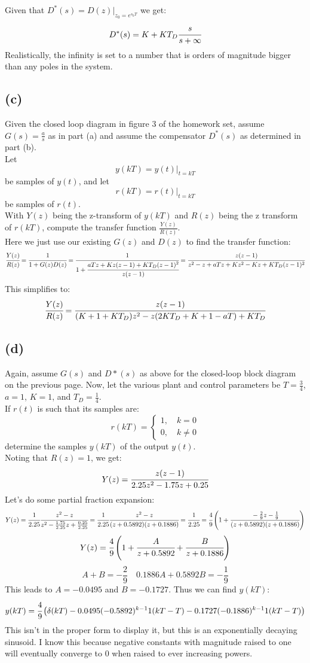 \documentclass{article}
\begin{document}
Given that $D^*(s)=D(z)\bigg|_{z_0=e^{s_0T}}$ we get:
\[D^*(s)=K+KT_D\cfrac{s}{s+\infty}\]
Realistically, the infinity is set to a number that is orders of magnitude bigger than any poles in the system.

\subsection*{(c)}
Given the closed loop diagram in figure 3 of the homework set, assume $G(s)=\frac{a}{s}$ as in part (a) and assume the compensator $D^*(s)$ as determined in part (b).\\
Let
\[y(kT)=y(t)\bigg|_{t=kT}\]
be samples of $y(t)$, and let
\[r(kT)=r(t)\bigg|_{t=kT}\]
be samples of $r(t)$.\\
With $Y(z)$ being the z-transform of $y(kT)$ and $R(z)$ being the z transform of $r(kT)$, compute the transfer function $\frac{Y(z)}{R(z)}$.\\

Here we just use our existing $G(z)$ and $D(z)$ to find the transfer function:
\[\cfrac{Y(z)}{R(z)}=\cfrac{1}{1+G(z)D(z)}=\cfrac{1}{1+\cfrac{aTz+Kz(z-1)+KT_D(z-1)^2}{z(z-1)}}=\cfrac{z(z-1)}{z^2-z+aTz+Kz^2-Kz+KT_D(z-1)^2}\]
This simplifies to:
\[\cfrac{Y(z)}{R(z)}=\cfrac{z(z-1)}{(K+1+KT_D)z^2-z(2KT_D+K+1-aT)+KT_D}\]

\subsection*{(d)}
Again, assume $G(s)$ and $D*(s)$ as above for the closed-loop block diagram on the previous page. Now, let the various plant and control parameters be $T=\frac{3}{4}$, $a=1$, $K=1$, and $T_D=\frac{1}{4}$.\\
If $r(t)$ is such that its samples are:
\[r(kT)=\left \{\begin{array}{c}1,\quad k=0\\0, \quad k\neq 0\end{array}\right .\]
determine the samples $y(kT)$ of the output $y(t)$.\\

Noting that $R(z)=1$, we get:
\[Y(z)=\cfrac{z(z-1)}{2.25z^2-1.75z+0.25}\]
Let's do some partial fraction expansion:
\[Y(z)=\cfrac{1}{2.25}\cfrac{z^2-z}{z^2-\frac{1.75}{2.25}z+\frac{0.25}{2.25}}=\cfrac{1}{2.25}\cfrac{z^2-z}{(z+0.5892)(z+0.1886)}=\cfrac{1}{2.25}=\cfrac{4}{9}\left( 1+\cfrac{-\frac{2}{9}z-\frac{1}{9}}{(z+0.5892)(z+0.1886)}\right )\]
\[Y(z)=\cfrac{4}{9}\left (1+\cfrac{A}{z+0.5892}+\cfrac{B}{z+0.1886}\right )\]
\[A+B=-\frac{2}{9}\quad 0.1886A+0.5892B=-\frac{1}{9}\]
This leads to $A=-0.0495$ and $B=-0.1727$. Thus we can find $y(kT)$:
\[y(kT)=\cfrac{4}{9}\left (\delta(kT)-0.0495(-0.5892)^{k-1}1(kT-T)-0.1727(-0.1886)^{k-1}1(kT-T)\right )\]
This isn't in the proper form to display it, but this is an exponentially decaying sinusoid. I know this because negative constants with magnitude raised to one will eventually converge to 0 when raised to ever increasing powers.
\end{document}
